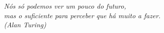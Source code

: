 \begin{epigrafe}
    \vspace*{\fill}
	\begin{flushright}
        \textit{Nós só podemos ver um pouco do futuro, \\ mas o suficiente para perceber que há muito a fazer.\\
		(Alan Turing)}
	\end{flushright}
\end{epigrafe}
